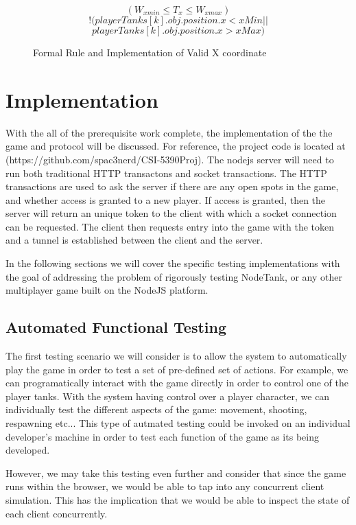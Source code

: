 \documentclass[conference]{IEEEtran}
\begin{document}
\begin{figure}[htbp]
\[ (W_{xmin} \leq T_{x} \leq W_{xmax}) \]
\[ !(playerTanks[k].obj.position.x < xMin ||\]
\[ playerTanks[k].obj.position.x > xMax) \]
\caption{Formal Rule and Implementation of Valid X coordinate}
\end{figure}


\section{Implementation}

With the all of the prerequisite work complete, the implementation of the the game and protocol will be discussed. For reference,
the project code is located at (https://github.com/spac3nerd/CSI-5390Proj). The nodejs server
will need to run both traditional HTTP transactons and socket transactions. The HTTP transactions are used to ask the server if
there are any open spots in the game, and whether access is granted to a new player. If access is granted, then the server will return
an unique token to the client with which a socket connection can be requested. The client then requests entry into the game
with the token and a tunnel is established between the client and the server.

In the following sections we will cover the specific testing implementations with the goal of addressing the problem of rigorously testing NodeTank, or any
other multiplayer game built on the NodeJS platform.


\subsection{Automated Functional Testing}

The first testing scenario we will consider is to allow the system to automatically play the game in order to test a set of pre-defined set of actions.
For example, we can programatically interact with the game directly in order to control one of the player tanks. With the system having control over a player character,
we can individually test the different aspects of the game: movement, shooting, respawning etc... This type of autmated testing could be invoked on an individual developer's
machine in order to test each function of the game as its being developed.

However, we may take this testing even further and consider that since the game runs within the browser, we would be able to tap into any concurrent client simulation. This
has the implication that we would be able to inspect the state of each client concurrently.
\end{document}
